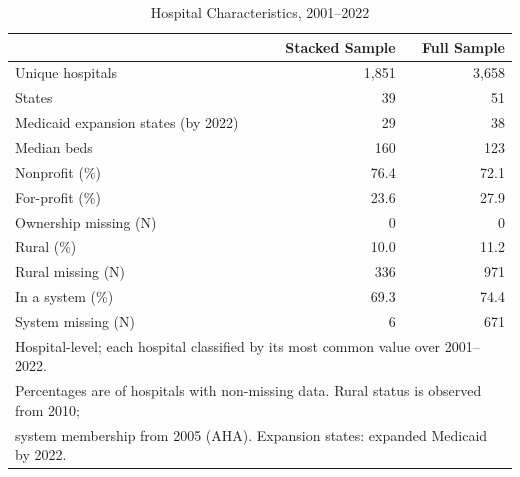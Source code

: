 \begin{table}[!h]
\centering
\caption{Hospital Characteristics, 2001--2022}
\centering
\begin{tabular}[t]{lrr}
\toprule
 & Stacked Sample & Full Sample\\
\midrule
Unique hospitals & 1,851 & 3,658\\
States & 39 & 51\\
Medicaid expansion states (by 2022) & 29 & 38\\
Median beds & 160 & 123\\
Nonprofit (\%) & 76.4 & 72.1\\
\addlinespace
For-profit (\%) & 23.6 & 27.9\\
\quad Ownership missing (N) & 0 & 0\\
Rural (\%) & 10.0 & 11.2\\
\quad Rural missing (N) & 336 & 971\\
In a system (\%) & 69.3 & 74.4\\
\addlinespace
\quad System missing (N) & 6 & 671\\
\bottomrule

\multicolumn{3}{l}{\footnotesize Hospital-level; each hospital classified by its most common value over 2001--2022.}\\
\multicolumn{3}{l}{\footnotesize Percentages are of hospitals with non-missing data. Rural status is observed from 2010;}\\
\multicolumn{3}{l}{\footnotesize system membership from 2005 (AHA). Expansion states: expanded Medicaid by 2022.}\\
\end{tabular}
\end{table}
